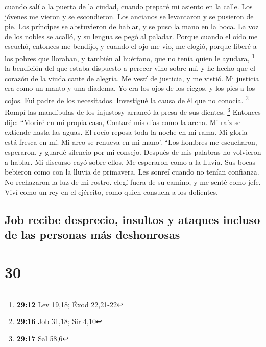  cuando salí a la puerta de la ciudad, cuando preparé mi
asiento en la calle.  Los jóvenes me vieron y se
escondieron. Los ancianos se levantaron y se pusieron de pie.
 Los príncipes se abstuvieron de hablar, y se puso la mano
en la boca.  La voz de los nobles se acalló, y su lengua
se pegó al paladar.  Porque cuando el oído me escuchó,
entonces me bendijo, y cuando el ojo me vio, me elogió, 
porque liberé a los pobres que lloraban, y también al huérfano, que no
tenía quien le ayudara, \footnote{\textbf{29:12} Lev 19,18; Éxod
  22,21-22}  la bendición del que estaba dispuesto a
perecer vino sobre mí, y he hecho que el corazón de la viuda cante de
alegría.  Me vestí de justicia, y me vistió. Mi justicia
era como un manto y una diadema.  Yo era los ojos de los
ciegos, y los pies a los cojos.  Fui padre de los
necesitados. Investigué la causa de él que no conocía. \footnote{\textbf{29:16}
  Job 31,18; Sir 4,10}  Rompí las mandíbulas de los
injustosy arrancó la presa de sus dientes. \footnote{\textbf{29:17} Sal
  58,6}  Entonces dije: ``Moriré en mi propia casa,
Contaré mis días como la arena.  Mi raíz se extiende
hasta las aguas. El rocío reposa toda la noche en mi rama.
 Mi gloria está fresca en mí. Mi arco se renueva en mi
mano'.  ``Los hombres me escucharon, esperaron, y guardé
silencio por mi consejo.  Después de mis palabras no
volvieron a hablar. Mi discurso cayó sobre ellos.  Me
esperaron como a la lluvia. Sus bocas bebieron como con la lluvia de
primavera.  Les sonreí cuando no tenían confianza. No
rechazaron la luz de mi rostro.  elegí fuera de su
camino, y me senté como jefe. Viví como un rey en el ejército, como
quien consuela a los dolientes.

\hypertarget{job-recibe-desprecio-insultos-y-ataques-incluso-de-las-personas-muxe1s-deshonrosas}{%
\subsection{Job recibe desprecio, insultos y ataques incluso de las
personas más
deshonrosas}\label{job-recibe-desprecio-insultos-y-ataques-incluso-de-las-personas-muxe1s-deshonrosas}}

\hypertarget{section-29}{%
\section{30}\label{section-29}}

